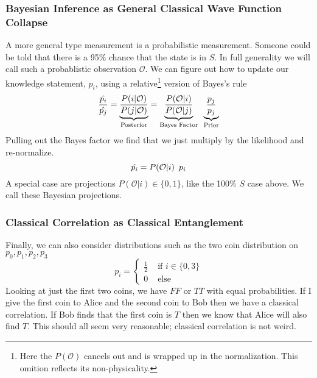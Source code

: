 \documentclass[12pt,a4paper]{article}
\begin{document}
\subsubsection{Bayesian Inference as General Classical Wave Function Collapse}
A more general type measurement is a probabilistic measurement.  Someone could be told that there is a 95\% chance that the state is in $S$.  In full generality we will call such a probablistic observation $\mathcal{O}$.  We can figure out how to update our knowledge statement, $p_i$, using a relative\footnote{Here the $P(\mathcal{O})$ cancels out and is wrapped up in the normalization. This omition reflects its non-physicality.} version of Bayes's rule
\[
  \frac{\hat{p_i}}{\hat{p_j}} = \underbrace{\frac{P(i | \mathcal{O})}{P(j | \mathcal{O})}}_\text{Posterior}
                              = \underbrace{\frac{P(\mathcal{O} | i)}{P(\mathcal{O}|j)}}_\text{Bayes Factor}  \hspace{0.07 in}  \underbrace{\frac{p_j}{p_j}}_\text{Prior}
\]
Pulling out the Bayes factor we find that we just multiply by the likelihood and re-normalize.
\[
  \hat{p_i} =  P(\mathcal{O} | i) \hspace{0.07 in} p_i
\]
A special case are projections $P(\mathcal{O} | i) \in \{0,1\}$, like the 100\% $S$ case above.  We call these Bayesian projections.

\subsubsection{Classical Correlation as Classical Entanglement}
Finally, we can also consider distributions such as the two coin distribution on $p_0,p_1,p_2,p_3$
\[
p_i = 
\left\{
\begin{split}
\frac{1}{2} & \mbox{ if } i \in \{0,3\}\\
0 &\mbox{ else }
\end{split}
\right.
\]
Looking at just the first two coins, we have $FF$ or $TT$ with equal probabilities.  If I give the first coin to Alice and the second coin to Bob then we have a classical correlation.  If Bob finds that the first coin is $T$ then we know that Alice will also find $T$.  This should all seem very reasonable; classical correlation is not weird.
\end{document}

